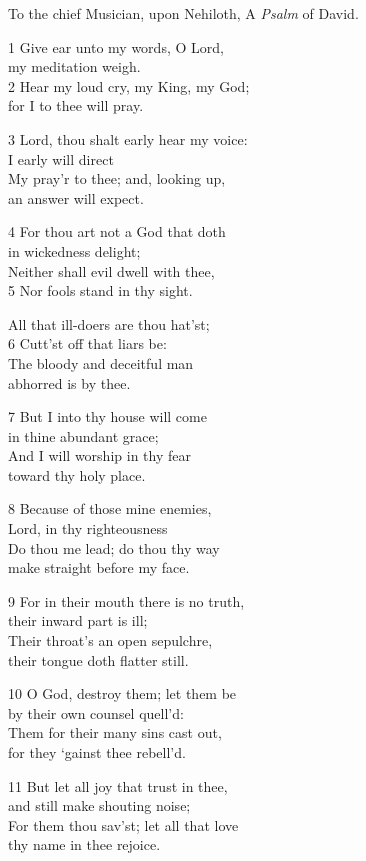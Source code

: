 \begin{multicols}{3}
To the chief Musician, upon Nehiloth,
A \emph{Psalm} of David.

1 Give ear unto my words, O Lord,\\
my meditation weigh.\\
2 Hear my loud cry, my King, my God;\\
for I to thee will pray.

3 Lord, thou shalt early hear my voice:\\
I early will direct\\
My pray’r to thee; and, looking up,\\
an answer will expect.

4 For thou art not a God that doth\\
in wickedness delight;\\
Neither shall evil dwell with thee,\\
5 Nor fools stand in thy sight.

All that ill-doers are thou hat’st;\\
6 Cutt’st off that liars be:\\
The bloody and deceitful man\\
abhorred is by thee.

7 But I into thy house will come\\
in thine abundant grace;\\
And I will worship in thy fear\\
toward thy holy place.

8 Because of those mine enemies,\\
Lord, in thy righteousness\\
Do thou me lead; do thou thy way\\
make straight before my face.

9 For in their mouth there is no truth,\\
their inward part is ill;\\
Their throat’s an open sepulchre,\\
their tongue doth flatter still.

10 O God, destroy them; let them be\\
by their own counsel quell’d:\\
Them for their many sins cast out,\\
for they ‘gainst thee rebell’d.

11 But let all joy that trust in thee,\\
and still make shouting noise;\\
For them thou sav’st; let all that love\\
thy name in thee rejoice.


\end{multicols}
